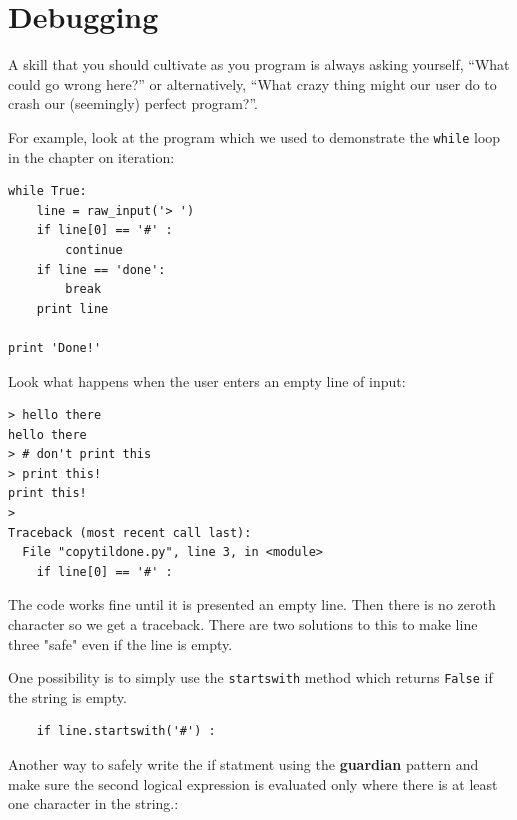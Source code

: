 \documentclass[10pt]{book}
\begin{document}



\section{Debugging}

A skill that you should cultivate as you program is always
asking yourself, ``What could go wrong here?'' or alternatively,
``What crazy thing might our user do to crash our (seemingly) 
perfect program?''.

For example, look at the program which we used to demonstrate
the {\tt while} loop in the chapter on iteration:

\beforeverb
\begin{verbatim}
while True:
    line = raw_input('> ')
    if line[0] == '#' :
        continue
    if line == 'done':
        break
    print line

print 'Done!'
\end{verbatim}
\afterverb
%
Look what happens when the user enters an empty line of input:

\beforeverb
\begin{verbatim}
> hello there
hello there
> # don't print this
> print this!
print this!
> 
Traceback (most recent call last):
  File "copytildone.py", line 3, in <module>
    if line[0] == '#' :
\end{verbatim}
\afterverb
%
The code works fine until it is presented an empty line.  Then
there is no zeroth character so we get a traceback.  There are two
solutions to this to make line three "safe" even if the line is 
empty.

One possibility is to simply use the {\tt startswith} method
which returns {\tt False} if the string is empty.

\beforeverb
\begin{verbatim}
    if line.startswith('#') :
\end{verbatim}
\afterverb
%
Another way to safely write the if statment using the {\bf guardian}
pattern and make sure the second logical expression is evaluated 
only where there is at least one character in the string.:
\end{document}
